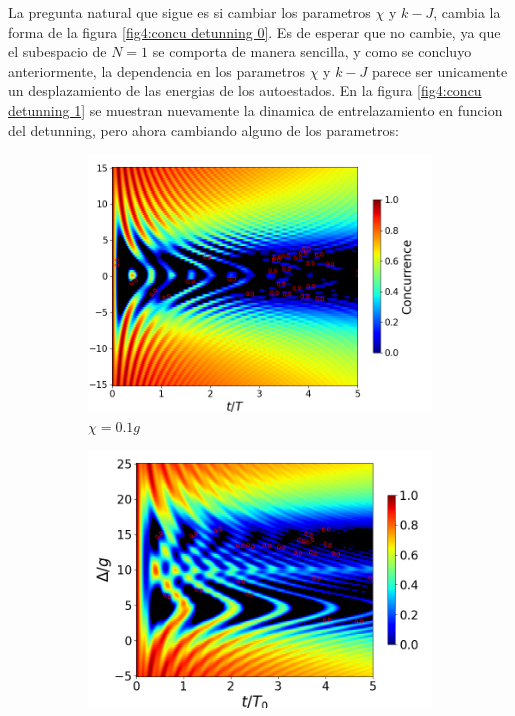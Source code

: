 La pregunta natural que sigue es si cambiar los parametros $\chi$ y $k-J$, cambia la forma de la figura \ref{fig4:concu detunning 0}. Es de esperar que no cambie, ya que el subespacio de $N=1$ se comporta de manera sencilla, y como se concluyo anteriormente, la dependencia en los parametros $\chi$ y $k-J$ parece ser unicamente un desplazamiento de las energias de los autoestados. En la figura \ref{fig4:concu detunning 1} se muestran nuevamente la dinamica de entrelazamiento en funcion del detunning, pero ahora cambiando alguno de los parametros:

\begin{figure}[h]
    \centering
    \begin{subfigure}{0.49\textwidth}
        \includegraphics[width=\textwidth]{figuras/ch4/concu/delta/eg1+ge1 k=0.0g x=0.1g J=0.0g gamma=0.25g concu delta dis.png}
        \caption{$\chi=0.1g$}
        \label{fig4:concu detunning 1 x1}
    \end{subfigure}
    \hfill
    \begin{subfigure}{0.49\textwidth}
        \includegraphics[width=\textwidth]{figuras/ch4/concu/delta/eg1+ge1 k=0.0g x=5.0g J=0.0g gamma=0.25g concu delta dis.png}

\end{subfigure}
\end{figure}

